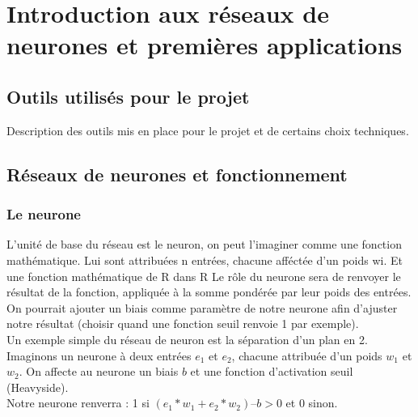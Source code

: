 


\chapter{Introduction aux réseaux de neurones et premières applications}

\section{Outils utilisés pour le projet}

Description des outils mis en place pour le projet et de certains choix techniques.

\section{Réseaux de neurones et fonctionnement}

\subsection{Le neurone} %
\label{sub:le_neurone}
L’unité de base du réseau est le neuron, on peut l’imaginer comme une fonction mathématique. Lui sont attribuées n entrées, chacune afféctée d’un poids wi. Et une fonction mathématique de R dans R Le rôle du neurone sera de renvoyer le résultat de la fonction, appliquée à la somme pondérée par leur poids des entrées. On pourrait ajouter un biais comme paramètre de notre neurone afin d’ajuster notre résultat (choisir quand une fonction seuil renvoie 1 par exemple).\\

Un exemple simple du réseau de neuron est la séparation d’un plan en 2.\\
Imaginons un neurone à deux entrées $e_1$ et $e_2$, chacune attribuée d’un poids $w_1$ et $w_2$. On affecte au neurone un biais $b$ et une fonction d’activation seuil (Heavyside).\\
Notre neurone renverra : 1 si $(e_1*w_1+e_2*w_2) – b >0$ et 0 sinon.\\

